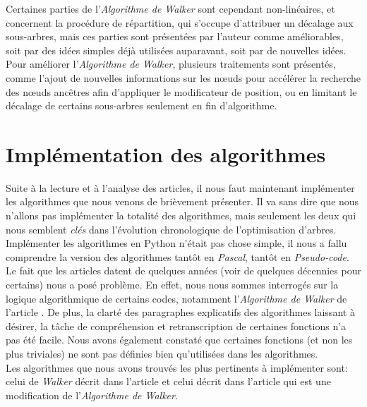 \documentclass{article}
\begin{document}
Certaines parties de l'\emph{Algorithme de Walker} sont cependant non-linéaires, et concernent la procédure de répartition, qui s'occupe d'attribuer un décalage aux sous-arbres, mais ces parties sont présentées par l'auteur comme améliorables, soit par des idées simples déjà utilisées auparavant, soit par de nouvelles idées.\\

Pour améliorer l'\emph{Algorithme de Walker}, plusieurs traitements sont présentés, comme l'ajout de nouvelles informations sur les n\oe{}uds pour accélérer la recherche des n\oe{}uds ancêtres afin d'appliquer le modificateur de position, ou en limitant le décalage de certains sous-arbres seulement en fin d'algorithme.\\

\newpage
\section{Implémentation des algorithmes}

Suite à la lecture et à l'analyse des articles, il nous faut maintenant implémenter les algorithmes que nous venons de brièvement présenter. Il va sans dire que nous n'allons pas implémenter la totalité des algorithmes, mais seulement les deux qui nous semblent \emph{clés} dans l'évolution chronologique de l'optimisation d'arbres.\\

Implémenter les algorithmes en Python n'était pas chose simple, il nous a fallu comprendre la version des algorithmes tantôt en \emph{Pascal}, tantôt en \emph{Pseudo-code}. Le fait que les articles datent de quelques années (voir de quelques décennies pour certains) nous a posé problème. En effet, nous nous sommes interrogés sur la logique algorithmique de certains codes, notamment l'\emph{Algorithme de Walker} de l'article \cite{article90}. De plus, la clarté des paragraphes explicatifs des algorithmes laissant à désirer, la tâche de compréhension et retranscription de certaines fonctions n'a pas été facile. Nous avons également constaté que certaines fonctions (et non les plus triviales) ne sont pas définies bien qu'utilisées dans les algorithmes.\\

Les algorithmes que nous avons trouvés les plus pertinents à implémenter sont: celui de \emph{Walker} décrit dans l'article \cite{article90} et celui décrit dans l'article \cite{article02} qui est une modification de l'\emph{Algorithme de Walker}.\\
\end{document}
